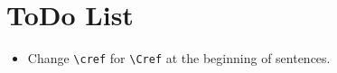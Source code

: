 \chapter*{ToDo List}

\begin{itemize}
    \tightlist
    \item Change \verb|\cref| for \verb|\Cref| at the beginning of sentences.
\end{itemize}
